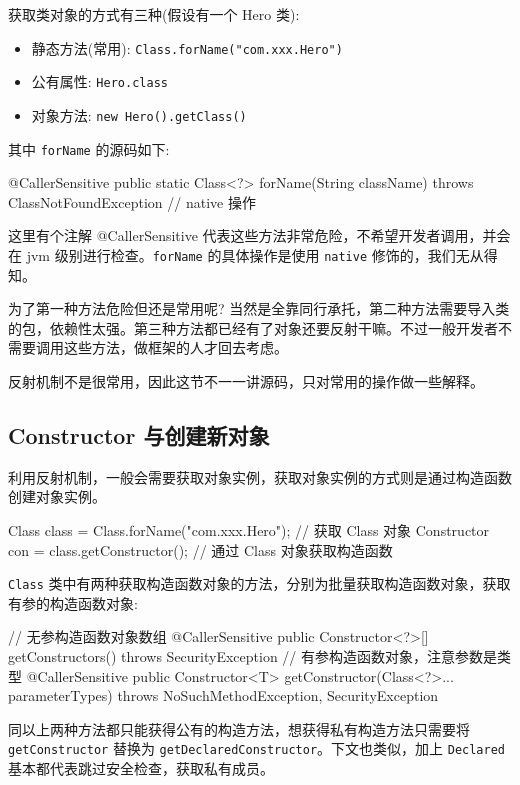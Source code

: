 获取类对象的方式有三种(假设有一个 Hero 类):
\begin{itemize}
    \item 静态方法(常用): \texttt{Class.forName("com.xxx.Hero")}
    \item 公有属性: \texttt{Hero.class}
    \item 对象方法: \texttt{new Hero().getClass()}
\end{itemize}

其中 \texttt{forName} 的源码如下:

\begin{Java}
@CallerSensitive
public static Class<?> forName(String className) throws ClassNotFoundException { 
    // native 操作 
}
\end{Java}

这里有个注解 @CallerSensitive 代表这些方法非常危险，不希望开发者调用，并会在 jvm 级别进行检查。\texttt{forName} 的具体操作是使用 \texttt{native} 修饰的，我们无从得知。

为了第一种方法危险但还是常用呢? 当然是全靠同行承托，第二种方法需要导入类的包，依赖性太强。第三种方法都已经有了对象还要反射干嘛。不过一般开发者不需要调用这些方法，做框架的人才回去考虑。

反射机制不是很常用，因此这节不一一讲源码，只对常用的操作做一些解释。

\subsection{Constructor 与创建新对象}

利用反射机制，一般会需要获取对象实例，获取对象实例的方式则是通过构造函数创建对象实例。

\begin{Java}
Class class = Class.forName("com.xxx.Hero");    // 获取 Class 对象
Constructor con = class.getConstructor();       // 通过 Class 对象获取构造函数
\end{Java}

\texttt{Class} 类中有两种获取构造函数对象的方法，分别为批量获取构造函数对象，获取有参的构造函数对象:

\begin{Java}
// 无参构造函数对象数组
@CallerSensitive
public Constructor<?>[] getConstructors() throws SecurityException
// 有参构造函数对象，注意参数是类型
@CallerSensitive
public Constructor<T> getConstructor(Class<?>... parameterTypes)
    throws NoSuchMethodException, SecurityException
\end{Java}

同以上两种方法都只能获得公有的构造方法，想获得私有构造方法只需要将 \texttt{getConstructor} 替换为 \texttt{getDeclaredConstructor}。下文也类似，加上 \texttt{Declared} 基本都代表跳过安全检查，获取私有成员。

